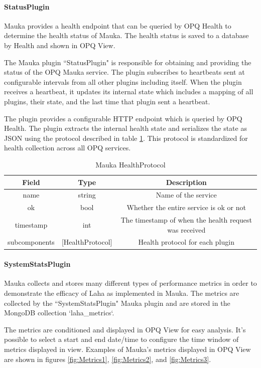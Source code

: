 \paragraph{StatusPlugin}
Mauka provides a health endpoint that can be queried by OPQ Health to determine the health status of Mauka. The health status is saved to a database by Health and shown in OPQ View.

The Mauka plugin ``StatusPlugin" is responsible for obtaining and providing the status of the OPQ Mauka service. The plugin subscribes to heartbeats sent at configurable intervals from all other plugins including itself. When the plugin receives a heartbeat, it updates its internal state which includes a mapping of all plugins, their state, and the last time that plugin sent a heartbeat. 

The plugin provides a configurable HTTP endpoint which is queried by OPQ Health. The plugin extracts the internal health state and serializes the state as JSON using the protocol described in table \ref{table:HealthProtocol}. This protocol is standardized for health collection across all OPQ services.

\begin{table}[H]
	\centering
	\caption{Mauka HealthProtocol}
	\begin{tabular}{|c|c|c|}
		\hline 
		Field & Type & Description \\ 
		\hline
		name & string & Name of the service \\
		\hline
		ok & bool & Whether the entire service is ok or not \\
		\hline
		timestamp & int & The timestamp of when the health request was received \\
		\hline
		subcomponents & [HealthProtocol] & Health protocol for each plugin \\
		\hline
	\end{tabular} 
	\label{table:HealthProtocol}
\end{table}

\paragraph{SystemStatsPlugin}
Mauka collects and stores many different types of performance metrics in order to demonstrate the efficacy of Laha as implemented in Mauka. The metrics are collected by the ``SystemStatsPlugin" Mauka plugin and are stored in the MongoDB collection `laha\_metrics`. 

The metrics are conditioned and displayed in OPQ View for easy analysis. It's possible to select a start and end date/time to configure the time window of metrics displayed in view. Examples of Mauka's metrics displayed in OPQ View are shown in figures \ref{fig:Metrics1}, \ref{fig:Metrics2}, and \ref{fig:Metrics3}.

